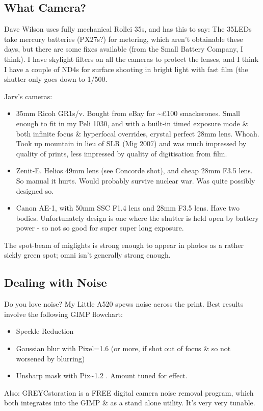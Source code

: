 \subsection{What Camera?}

Dave Wilson uses fully mechanical Rollei 35s, and has this to say: The 35LEDs take mercury batteries (PX27s?) for metering, which aren't obtainable these days, but there are some fixes available (from the Small Battery Company, I think). I have skylight filters on all the cameras to protect the lenses, and I think I have a couple of ND4s for surface shooting in bright light with fast film (the shutter only goes down to 1/500.

Jarv's cameras:

\begin{itemize}
    \item 35mm Ricoh GR1s/v. Bought from eBay for \textasciitilde£100 smackerones. Small enough to fit in my Peli 1030, and with a built-in timed exposure mode \& both infinite focus \& hyperfocal overrides, crystal perfect 28mm lens. Whoah. Took up mountain in lieu of SLR (Mig 2007) and was much impressed by quality of prints, less impressed by quality of digitisation from film.
    \item Zenit-E. Helios 49mm lens (see Concorde shot), and cheap 28mm F3.5 lens. So manual it hurts. Would probably survive nuclear war. Was quite possibly designed so.
    \item Canon AE-1, with 50mm SSC F1.4 lens and 28mm F3.5 lens. Have two bodies. Unfortunately design is one where the shutter is held open by battery power - so not so good for super super long exposure.
\end{itemize}

The spot-beam of miglights is strong enough to appear in photos as a rather sickly green spot; omni isn't generally strong enough. 


\subsection{Dealing with Noise}
Do you love noise? My Little A520 spews noise across the print. Best results involve the following GIMP flowchart:

    \begin{itemize}
        \item Speckle Reduction
        \item Gaussian blur with Pixel=1.6 (or more, if shot out of focus \& so not worsened by blurring)
        \item Unsharp mask with Pix\textasciitilde1.2 . Amount tuned for effect.
    \end{itemize}

Also: GREYCstoration is a FREE digital camera noise removal program, which both integrates into the GIMP \& as a stand alone utility. It's very very tunable.


